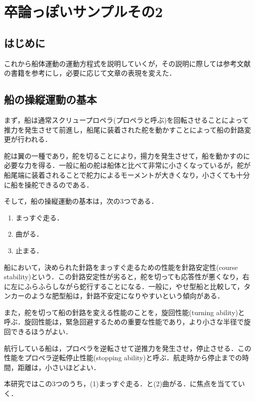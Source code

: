 \renewcommand{\prechaptername}{付録}
\renewcommand{\postchaptername}{}
\renewcommand{\thechapter}{\Alph{chapter}}

\chapter{卒論っぽいサンプルその2}

\section{はじめに}
これから船体運動の運動方程式を説明していくが，その説明に際しては参考文献の書籍を参考にし，必要に応じて文章の表現を変えた．

\section{船の操縦運動の基本}
まず，船は通常スクリュープロペラ(プロペラと呼ぶ)を回転させることによって推力を発生させて前進し，船尾に装着された舵を動かすことによって船の針路変更が行われる．

舵は翼の一種であり，舵を切ることにより，揚力を発生させて，船を動かすのに必要な力を得る．一般に船の舵は船体と比べて非常に小さくなっているが，舵が船尾端に装着されることで舵力によるモーメントが大きくなり，小さくても十分に船を操舵できるのである．

そして，船の操縦運動の基本は，次の3つである．
\begin{enumerate}
	\item まっすぐ走る．
	\item 曲がる．
	\item 止まる．
\end{enumerate}

船において，決められた針路をまっすぐ走るための性能を針路安定性(course stability)という．この針路安定性が劣ると，舵を切っても応答性が悪くなり，右に左にふらふらしながら蛇行することになる．一般に，やせ型船と比較して，タンカーのような肥型船は，針路不安定になりやすいという傾向がある．

また，舵を切って船の針路を変える性能のことを，旋回性能(turning ability)と呼ぶ．旋回性能は，緊急回避するための重要な性能であり，より小さな半径で旋回できるほうがよい．

航行している船は，プロペラを逆転させて逆推力を発生させ，停止させる．この性能をプロペラ逆転停止性能(stopping ability)と呼ぶ．航走時から停止までの時間，距離は，小さいほどよい．

本研究ではこの3つのうち，(1)まっすぐ走る．と(2)曲がる．に焦点を当てていく．

